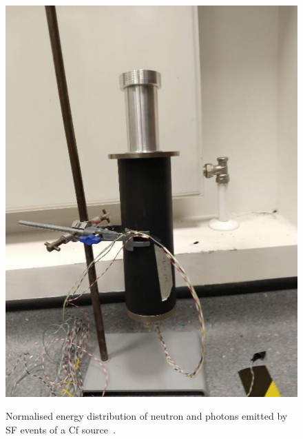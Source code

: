 \begin{figure}
	\begin{minipage}[t]{0.45\textwidth}
		\centering
		\resizebox{\textwidth}{!}{}
		\caption{Normalised energy distribution of neutron and photons emitted %
			by SF events of a Cf source~\cite{PhysRev.104.699, PhysRev.108.411}.}
		\label{fig:spectra}
	\end{minipage}
	\hfill
	\begin{minipage}[t]{0.56\textwidth}
		\centering
		\includegraphics[width=0.4\linewidth]{device.png}
		\label{fig:setup}
	\end{minipage}
\end{figure}


